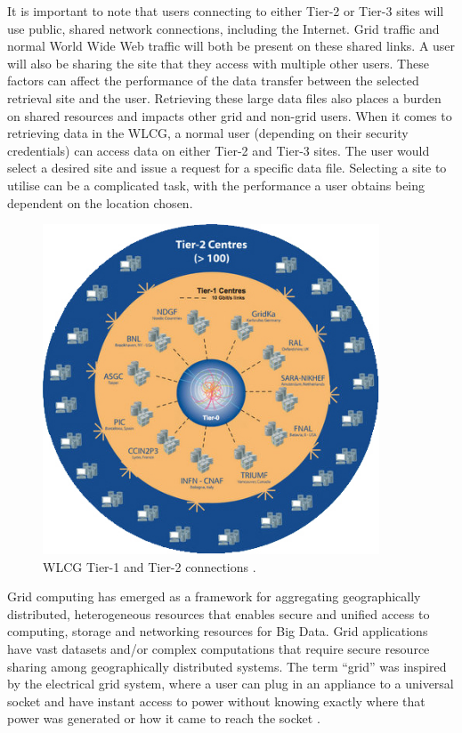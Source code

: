 It is important to note that users connecting to either Tier-2 or Tier-3 sites will use public, shared network connections, including the Internet. Grid traffic and normal World Wide Web traffic will both be present on these shared links. A user will also be sharing the site that they access with multiple other users. These factors can affect the performance of the data transfer between the selected retrieval site and the user. Retrieving these large data files also places a burden on shared resources and impacts other grid and non-grid users. When it comes to retrieving data in the WLCG, a normal user (depending on their security credentials) can access data on either Tier-2 and Tier-3 sites. The user would select a desired site and issue a request for a specific data file. Selecting a site to utilise can be a complicated task, with the performance a user obtains being dependent on the location chosen.

\begin{figure}[H]
  \centering
  \includegraphics[width=100mm]{./Figures/lch_network.jpg}
  \caption{\small WLCG Tier-1 and Tier-2 connections \cite{LHCGrid7}.}\label{fig:lhc_network}
\end{figure}

Grid computing has emerged as a framework for aggregating geographically distributed, heterogeneous resources that enables secure and unified access to computing, storage and networking resources \cite{Foster9} for Big Data. Grid applications have vast datasets and/or complex computations that require secure resource sharing among geographically distributed systems. The term “grid” was inspired by the electrical grid system, where a user can plug in an appliance to a universal socket and have instant access to power without knowing exactly where that power was generated or how it came to reach the socket \cite{Foster9}.

